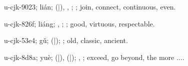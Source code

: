 \begin{multicols}{2}
{\cjkgGlue{}u-cjk-9023; lián; \cjkgGlue{}\cjkgGlue{}(\cjkgGlue{}|\cjkgGlue{}), \cjkgGlue{}\cjkgGlue{}\cjkgGlue{}, \cjkgGlue{}\cjkgGlue{}\cjkgGlue{}; \cjkgGlue{}; join, connect, continuous, even.

\cjkgGlue{}u-cjk-826f; liáng; \cjkgGlue{}\cjkgGlue{}\cjkgGlue{}, \cjkgGlue{}\cjkgGlue{}\cjkgGlue{}; \cjkgGlue{}; good, virtuous, respectable.

\cjkgGlue{}u-cjk-53e4; gǔ; \cjkgGlue{}\cjkgGlue{}(\cjkgGlue{}|\cjkgGlue{}); \cjkgGlue{}; old, classic, ancient.

\cjkgGlue{}u-cjk-8d8a; yuè; \cjkgGlue{}\cjkgGlue{}(\cjkgGlue{}|\cjkgGlue{}), \cjkgGlue{}\cjkgGlue{}(\cjkgGlue{}|\cjkgGlue{}); \cjkgGlue{}, \cjkgGlue{}; exceed, go beyond, the more ....

}
\end{multicols}
